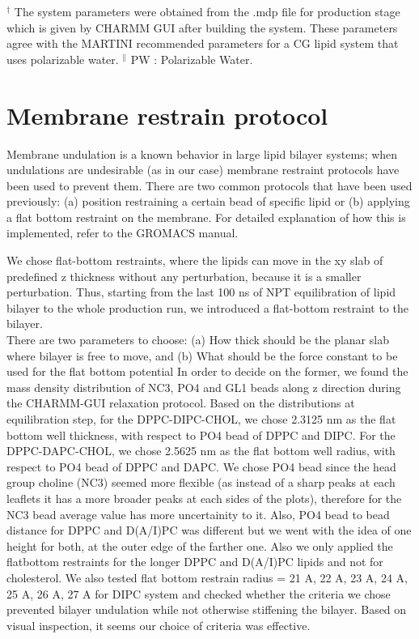 \documentclass[10pt]{article}
\let\oldsection\section
\renewcommand{\section}{\clearpage\oldsection}
\begin{document}
$^\dagger$ The system parameters were obtained from the .mdp file for production stage which is given by CHARMM GUI\cite{Qi2015}
after building the system. These parameters agree with the MARTINI recommended parameters\cite{DeJong2016} for a CG lipid system that uses polarizable water\cite{Yesylevskyy2010}.
$^{\parallel}$ PW : Polarizable Water.

\section{Membrane restrain protocol}

Membrane undulation is a known behavior in large lipid bilayer systems; when undulations are undesirable (as in our case) membrane restraint protocols have been used to prevent them\cite{Ingolfsson2014,Lin2019,Su2020}.
There are two common protocols that have been used previously: (a) position restraining a certain bead of specific lipid or
(b) applying a flat bottom restraint on the membrane.
For detailed explanation of how this is implemented, refer to the GROMACS manual\cite{GromacsManual}.

We chose flat-bottom restraints, where the lipids can move in the xy slab of predefined z thickness without any perturbation, because it is a smaller perturbation.
Thus, starting from the last 100 ns of NPT equilibration of lipid bilayer to the whole production run,
we introduced a flat-bottom restraint to the bilayer.\\

There are two parameters to choose: (a) How thick should be the planar slab where bilayer is free to move, and
(b) What should be the force constant to be used for the flat bottom potential
In order to decide on the former, we found the mass density distribution of NC3, PO4 and GL1 beads along z direction during the CHARMM-GUI relaxation protocol.
Based on the distributions at equilibration step, for the DPPC-DIPC-CHOL, we chose 2.3125 nm as the flat bottom well thickness, with respect to PO4 bead of DPPC and DIPC.
For the DPPC-DAPC-CHOL, we chose 2.5625 nm as the flat bottom well radius, with respect to PO4 bead of DPPC and DAPC.
We chose PO4 bead since the head group choline (NC3) seemed more flexible (as instead of a sharp peaks at each leaflets it has a more broader peaks at each sides of the plots), therefore for the NC3 bead average value has more uncertainity to it.
Also, PO4 bead to bead distance for DPPC and D(A/I)PC was different but we went with the idea of one height for both, at the outer edge of the farther one.
Also we only applied the flatbottom restraints for the longer DPPC and D(A/I)PC lipids and not for cholesterol.
We also tested flat bottom restrain radius = 21 A, 22 A, 23 A, 24 A, 25 A, 26 A, 27 A for DIPC system and checked whether the criteria we chose prevented bilayer undulation while not otherwise stiffening the bilayer.
Based on visual inspection,  it seems our choice of criteria was effective.
\end{document}
